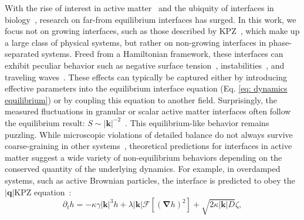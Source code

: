 \documentclass[aps,
reprint,
superscriptaddress,









amsmath,amssymb,floatfix,






prl
]{revtex4-2}
\begin{document}
With the rise of interest in active matter~\cite{te2025metareview, marchetti2013hydrodynamics, cates2024active} and the ubiquity of interfaces in biology~\cite{foty2005differential, hyman2014liquid, kammeraat2025correlated, schamberger2023curvature, sabari2020biomolecular, brangwynne2009germline, molliex2015phase}, research on far-from equilibrium interfaces has surged. In this work, we focus not on growing interfaces, such as those described by KPZ~\cite{kardar1986dynamic, takeuchi2010universal}, which make up a large class of physical systems, but rather on non-growing interfaces in phase-separated systems. Freed from a Hamiltonian framework, these interfaces can exhibit peculiar behavior such as negative surface tension~\cite{bialke2015negative,fausti2021capillary, singh2019hydrodynamically, cates2024active}, instabilities~\cite{zhao2024asymmetric,alert2022fingering, onuki2002phase, adkins2022dynamics, martinez2025interfacial}, and traveling waves~\cite{gulati2024traveling, barthelet1998benjamin, langford2024phase, rasshofer2025capillary}. These effects can typically be captured either by introducing effective parameters into the equilibrium interface equation (Eq. \eqref{eq: dynamics equilibrium}) or by coupling this equation to another field. Surprisingly, the measured fluctuations in granular or scalar active matter interfaces often follow the equilibrium result: $S\sim |\bm k|^{-2}$~\cite{luu2013capillarylike, yao2025interfacial, Wysocki_2016, langford2024theory, patch2018curvature, lee2017interface, paliwal2017non, del2019interface,sun2025interfacial, patteson2018propagation, coelho2020propagation, chacon2022intrinsic}. This equilibrium-like behavior remains puzzling. While microscopic violations of detailed balance do not always survive coarse-graining in other systems~\cite{lorenzana2025nonreciprocity, papanikolaou2024dynamic, caballero2020stealth, o2022time, plati2024self, crisanti2012nonequilibrium, fodor2022irreversibility,lucente2022inference}, theoretical predictions for interfaces in active matter suggest a wide variety of non-equilibrium behaviors depending on the conserved quantity of the underlying dynamics. For example, in overdamped systems, such as active Brownian particles, the interface is predicted to obey the $|\bm q|$KPZ equation~\cite{besse2023interface, toner2023roughening}:
\begin{equation}
    \partial_t h = -\kappa\gamma |\bm{k}|^{3}h+\lambda|\bm k|\mathcal F\left[(\bm \nabla h)^2\right] + \sqrt{2\kappa |\bm{k}|D} \zeta,
    \label{eq: qkpz}
\end{equation}
\end{document}
